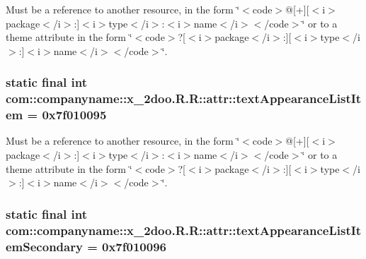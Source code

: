 Must be a reference to another resource, in the form \char`\"{}$<$code$>$@\mbox{[}+\mbox{]}\mbox{[}$<$i$>$package$<$/i$>$:\mbox{]}$<$i$>$type$<$/i$>$:$<$i$>$name$<$/i$>$$<$/code$>$\char`\"{} or to a theme attribute in the form \char`\"{}$<$code$>$?\mbox{[}$<$i$>$package$<$/i$>$:\mbox{]}\mbox{[}$<$i$>$type$<$/i$>$:\mbox{]}$<$i$>$name$<$/i$>$$<$/code$>$\char`\"{}. \hypertarget{classcom_1_1companyname_1_1x__2doo_1_1_r_1_1attr_9a6f00adef5f9f8386a17232acf294af}{
\subsubsection[{textAppearanceListItem}]{\setlength{\rightskip}{0pt plus 5cm}static final int com::companyname::x\_\-2doo.R.R::attr::textAppearanceListItem = 0x7f010095}}
\label{classcom_1_1companyname_1_1x__2doo_1_1_r_1_1attr_9a6f00adef5f9f8386a17232acf294af}


Must be a reference to another resource, in the form \char`\"{}$<$code$>$@\mbox{[}+\mbox{]}\mbox{[}$<$i$>$package$<$/i$>$:\mbox{]}$<$i$>$type$<$/i$>$:$<$i$>$name$<$/i$>$$<$/code$>$\char`\"{} or to a theme attribute in the form \char`\"{}$<$code$>$?\mbox{[}$<$i$>$package$<$/i$>$:\mbox{]}\mbox{[}$<$i$>$type$<$/i$>$:\mbox{]}$<$i$>$name$<$/i$>$$<$/code$>$\char`\"{}. \hypertarget{classcom_1_1companyname_1_1x__2doo_1_1_r_1_1attr_a94d87aabbe8326b150f14b43dcc4e36}{
\subsubsection[{textAppearanceListItemSecondary}]{\setlength{\rightskip}{0pt plus 5cm}static final int com::companyname::x\_\-2doo.R.R::attr::textAppearanceListItemSecondary = 0x7f010096}}
\label{classcom_1_1companyname_1_1x__2doo_1_1_r_1_1attr_a94d87aabbe8326b150f14b43dcc4e36}


